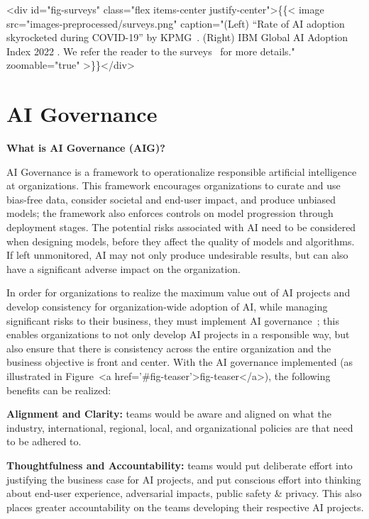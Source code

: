 \documentclass{article}
\begin{document}
<div id="fig-surveys" class="flex items-center justify-center">\{\{< image src="images-preprocessed/surveys.png" caption="(Left) ``Rate of AI adoption skyrocketed during COVID-19'' by KPMG~\cite{KPMG}. (Right) IBM Global AI Adoption Index 2022 \cite{IBM}. We refer the reader to the surveys~\cite{KPMG, IBM} for more details." zoomable="true" >\}\}</div>




\section{AI Governance}

\textbf{What is AI Governance (AIG)?}
\begin{displayquote}

AI Governance is a framework to operationalize responsible artificial intelligence at organizations. This framework encourages organizations to curate and use bias-free data, consider societal and end-user impact, and produce unbiased models; the framework also enforces controls on model progression through deployment stages. The potential risks associated with AI need to be considered when designing models, before they affect the quality of models and algorithms. If left unmonitored, AI may not only produce undesirable results, but can also have a significant adverse impact on the organization.

\end{displayquote}

In order for organizations to realize the maximum value out of AI projects and develop consistency for organization-wide adoption of AI, while managing significant risks to their business, they must implement AI governance~\cite{reddy2020governance, dafoe2018ai, gasser2017layered, kuziemski2020ai}; this enables organizations to not only develop AI projects in a responsible way, but also ensure that there is consistency across the entire organization and the business objective is front and center. With the AI governance implemented (as illustrated in Figure~<a href='#fig-teaser'>fig-teaser</a>), the following benefits can be realized:

\textbf{Alignment and Clarity:} teams would be aware and aligned on what the industry, international, regional, local, and organizational policies are that need to be adhered to. 

\textbf{Thoughtfulness and Accountability:} teams would put deliberate effort into justifying the business case for AI projects, and put conscious effort into thinking about end-user experience, adversarial impacts, public safety \& privacy. This also places greater accountability on the teams developing their respective AI projects.
\end{document}
